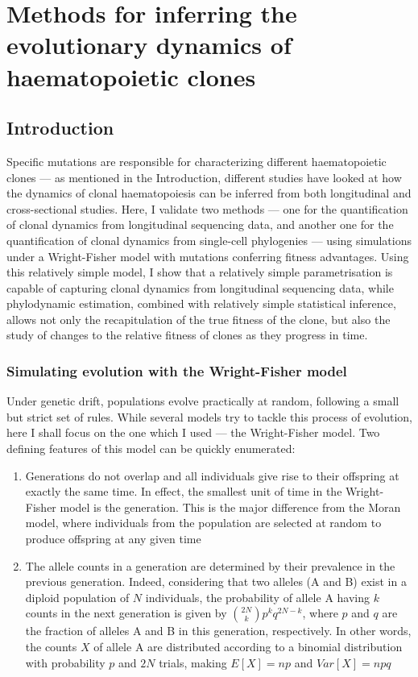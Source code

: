 \chapter{Methods for inferring the evolutionary dynamics of haematopoietic clones}

\section{Introduction}

Specific mutations are responsible for characterizing different haematopoietic clones --- as mentioned in the Introduction, different studies have looked at how the dynamics of clonal haematopoiesis can be inferred from both longitudinal and cross-sectional studies. Here, I validate two methods --- one for the quantification of clonal dynamics from longitudinal sequencing data, and another one for the quantification of clonal dynamics from single-cell phylogenies --- using simulations under a Wright-Fisher model with mutations conferring fitness advantages. Using this relatively simple model, I show that a relatively simple parametrisation is capable of capturing clonal dynamics from longitudinal sequencing data, while phylodynamic estimation, combined with relatively simple statistical inference, allows not only the recapitulation of the true fitness of the clone, but also the study of changes to the relative fitness of clones as they progress in time.

\subsection{Simulating evolution with the Wright-Fisher model}

Under genetic drift, populations evolve practically at random, following a small but strict set of rules. While several models try to tackle this process of evolution, here I shall focus on the one which I used --- the Wright-Fisher model. Two defining features of this model can be quickly enumerated:

\begin{enumerate}
	\item Generations do not overlap and all individuals give rise to their offspring at exactly the same time. In effect, the smallest unit of time in the Wright-Fisher model is the generation. This is the major difference from the Moran model, where individuals from the population are selected at random to produce offspring at any given time
	\item The allele counts in a generation are determined by their prevalence in the previous generation. Indeed, considering that two alleles (A and B) exist in a diploid population of $N$ individuals, the probability of allele A having $k$ counts in the next generation is given by $\binom{2N}{k}p^kq^{2N-k}$, where $p$ and $q$ are the fraction of alleles A and B in this generation, respectively. In other words, the counts $X$ of allele A are distributed according to a binomial distribution with probability $p$ and $2N$ trials, making $E[X] = np$ and $Var[X] = npq$
\end{enumerate}

